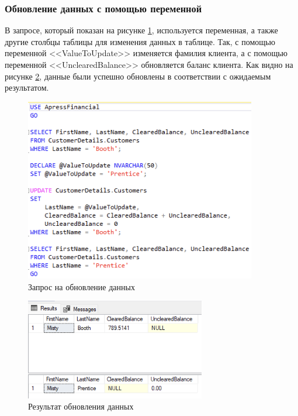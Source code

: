 \documentclass[a4paper, 14pt]{extarticle}
\begin{document}
\subsubsection{Обновление данных с помощью переменной}

В запросе, который показан на рисунке \ref{fig:task-2-3}, используется
переменная, а также другие столбцы таблицы для изменения данных в таблице. Так,
с помощью переменной <<\foreignlanguage{english}{ValueToUpdate}>> изменяется
фамилия клиента, а с помощью переменной
<<\foreignlanguage{english}{UnclearedBalance}>> обновляется баланс клиента. Как
видно на рисунке \ref{fig:task-2-4}, данные были успешно обновлены в
соответствии с ожидаемым результатом.

\begin{figure}[H]
  \centering
  \includegraphics[width=0.9\textwidth]{images/task-2/3.png}
  \caption{Запрос на обновление данных}
  \label{fig:task-2-3}
\end{figure}

\begin{figure}[H]
  \centering
  \includegraphics[width=0.7\textwidth]{images/task-2/4.png}
  \caption{Результат обновления данных}
  \label{fig:task-2-4}
\end{figure}
\end{document}
